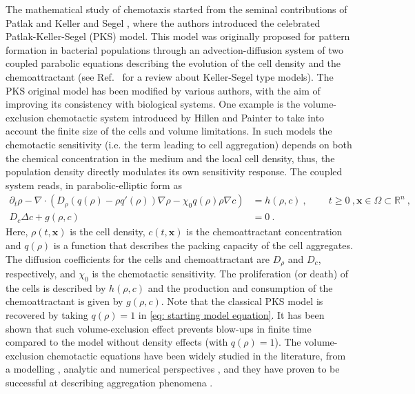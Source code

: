 \documentclass[review,onefignum,onetabnum]{siamart220329}
\begin{document}
The mathematical study of chemotaxis started from the seminal contributions of Patlak \cite{patlak1953random} and Keller and Segel \cite{keller1970initiation,keller1971model}, where the authors introduced the celebrated Patlak-Keller-Segel (PKS) model. This model was originally proposed for pattern formation in bacterial populations through an advection-diffusion system of two coupled parabolic equations describing the evolution of the cell density and the chemoattractant (see Ref.~\cite{Hillen2009} for a review about Keller-Segel type models). %
The PKS original model has been modified by various authors, with the aim of improving its consistency with biological systems. One example is the volume-exclusion chemotactic system introduced by Hillen and Painter \cite{painter2002volume} to take into account the finite size of the cells and volume limitations. In such models the chemotactic sensitivity (i.e. the term leading to cell aggregation) depends on both the chemical concentration in the medium and the local cell density, thus, the population density directly modulates its own sensitivity response. The coupled system reads, in {\color{red}{its}} parabolic-elliptic form as
\begin{equation}
\begin{aligned}
    \partial_t\rho-\nabla\cdot\left(D_\rho(q(\rho)-\rho q'(\rho))\nabla\rho-\chi_0q(\rho)\rho\nabla c\right)&=h(\rho,c)\ , \ \qquad t\geq 0\ , \mathbf{x}\in \Omega\subset\mathbb{R}^n\ ,\\
    D_c\Delta c+g(\rho,c)& = 0\ .
    \label{eq: starting model equation}
\end{aligned}
\end{equation}
Here, $\rho(t,\mathbf{x})$ is the cell density, $c(t,\mathbf{x})$ is the chemoattractant concentration and  $q(\rho)$ is a function that describes the packing capacity of the cell aggregates.  The diffusion coefficients for the cells and chemoattractant are $D_\rho$ and $D_c$, respectively, and $\chi_0$ is the chemotactic sensitivity. The proliferation (or death) of the cells is described by $h(\rho,c)$ and the production and consumption of the chemoattractant is given by $g(\rho,c)$. Note that the classical PKS model is recovered by taking $q(\rho) = 1$ in \cref{eq: starting model equation}.  It has been shown \cite{wrzosek2010volume,calvez2006volume,zheng2015boundedness} that such volume-exclusion effect prevents blow-ups in finite time compared to the model without density effects (with $q(\rho) = 1$). The volume-exclusion chemotactic equations have been widely studied in
the literature, from a modelling \cite{painter2002volume,wang2010chemotaxis}, analytic \cite{wrzosek2010volume,han2017pattern,ma2012stationary,dolak2005keller} and numerical perspectives \cite{ibrahim2014efficacy}, and
they have proven to be successful at describing aggregation phenomena \cite{almeida2020treatment,bubba2019chemotaxis}. 
\end{document}
